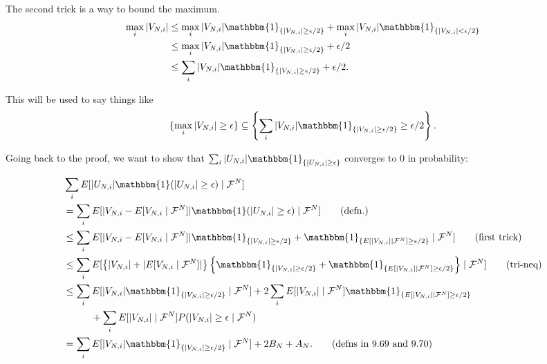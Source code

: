 \documentclass{article}
\begin{document}
The second trick is a way to bound the maximum. 
\begin{align*}
\max_{i} |V_{N,i}| &\le \max_{i} |V_{N,i}| \mathbbm{1}_{\{ |V_{N,i}| \ge \epsilon / 2 \} } + \max_{i} |V_{N,i}| \mathbbm{1}_{\{ |V_{N,i}| < \epsilon / 2 \} } \\
&\le \max_{i} |V_{N,i}| \mathbbm{1}_{\{ |V_{N,i}| \ge \epsilon / 2 \} } + \epsilon / 2 \\
&\le \sum_{i} |V_{N,i}| \mathbbm{1}_{\{ |V_{N,i}| \ge \epsilon / 2 \} } + \epsilon / 2.
\end{align*}

This will be used to say things like
$$
\{ \max_{i} |V_{N,i}|  \ge \epsilon \} \subseteq \left\{ \sum_{i} |V_{N,i}| \mathbbm{1}_{\{ |V_{N,i}| \ge \epsilon / 2 \} } \ge \epsilon/2 \right\}.
$$

Going back to the proof, we want to show that $\sum_i |U_{N,i}| \mathbbm{1}_{ \{|U_{N,i}| \ge \epsilon \} } $ converges to $0$ in probability:

\begin{align*}
&\sum_i E[ | U_{N,i} |  \mathbbm{1}(|U_{N,i}| \ge \epsilon) \mid \mathcal{F}^N] \\
&= \sum_i E[ | V_{N,i} - E[V_{N,i} \mid \mathcal{F}^N] |  \mathbbm{1}(|U_{N,i}| \ge \epsilon) \mid \mathcal{F}^N] \tag{defn.} \\
&\le \sum_i E[ | V_{N,i} - E[V_{N,i} \mid \mathcal{F}^N] |  \mathbbm{1}_{ \{ |V_{N,i}| \ge \epsilon/2  \}  } + \mathbbm{1}_{  \{ E[|V_{N,i}| \mid \mathcal{F}^N] \ge \epsilon/2 \}  } \mid \mathcal{F}^N] \tag{first trick} \\
&\le \sum_i E[ \left\{ | V_{N,i}| + |E[V_{N,i} \mid \mathcal{F}^N] | \right\} \left\{  \mathbbm{1}_{ \{ |V_{N,i}| \ge \epsilon/2  \}  } + \mathbbm{1}_{  \{ E[|V_{N,i}| \mid \mathcal{F}^N] \ge \epsilon/2 \}  } \right\} \mid \mathcal{F}^N]  \tag{tri-neq} \\
&\le \sum_i E[  | V_{N,i}|   \mathbbm{1}_{ \{ |V_{N,i}| \ge \epsilon/2  \}  } \mid \mathcal{F}^N] +
  2 \sum_i E[ | V_{N,i}| \mid \mathcal{F}^N] \mathbbm{1}_{  \{ E[|V_{N,i}| \mid \mathcal{F}^N] \ge \epsilon/2 \}  } \\
&\hspace{10mm} + \sum_i E[ | V_{N,i}|  \mid \mathcal{F}^N] P(|V_{N,i}| \ge \epsilon \mid \mathcal{F}^N) \\
&= \sum_i E[ | V_{N,i}|   \mathbbm{1}_{ \{ |V_{N,i}| \ge \epsilon/2  \}  } \mid \mathcal{F}^N] +  2B_N + A_N. \tag{defns in 9.69 and 9.70} \\
\end{align*}
\end{document}
